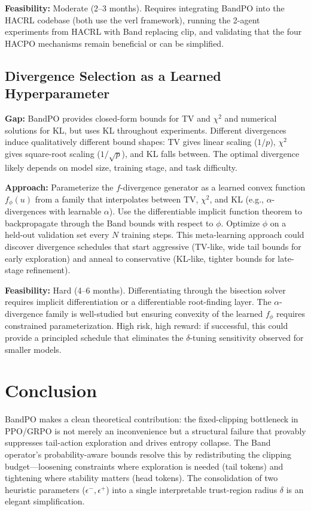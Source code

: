 \documentclass[11pt]{article}
\begin{document}
\textbf{Feasibility:} Moderate (2--3 months). Requires integrating BandPO into the HACRL codebase (both use the verl framework), running the 2-agent experiments from HACRL with Band replacing clip, and validating that the four HACPO mechanisms remain beneficial or can be simplified.

\subsection{Divergence Selection as a Learned Hyperparameter}

\textbf{Gap:} BandPO provides closed-form bounds for TV and $\chi^2$ and numerical solutions for KL, but uses KL throughout experiments. Different divergences induce qualitatively different bound shapes: TV gives linear scaling ($1/p$), $\chi^2$ gives square-root scaling ($1/\sqrt{p}$), and KL falls between. The optimal divergence likely depends on model size, training stage, and task difficulty.

\textbf{Approach:} Parameterize the $f$-divergence generator as a learned convex function $f_\phi(u)$ from a family that interpolates between TV, $\chi^2$, and KL (e.g., $\alpha$-divergences with learnable $\alpha$). Use the differentiable implicit function theorem to backpropagate through the Band bounds with respect to $\phi$. Optimize $\phi$ on a held-out validation set every $N$ training steps. This meta-learning approach could discover divergence schedules that start aggressive (TV-like, wide tail bounds for early exploration) and anneal to conservative (KL-like, tighter bounds for late-stage refinement).

\textbf{Feasibility:} Hard (4--6 months). Differentiating through the bisection solver requires implicit differentiation or a differentiable root-finding layer. The $\alpha$-divergence family is well-studied but ensuring convexity of the learned $f_\phi$ requires constrained parameterization. High risk, high reward: if successful, this could provide a principled schedule that eliminates the $\delta$-tuning sensitivity observed for smaller models.

\section{Conclusion}

BandPO makes a clean theoretical contribution: the fixed-clipping bottleneck in PPO/GRPO is not merely an inconvenience but a structural failure that provably suppresses tail-action exploration and drives entropy collapse. The Band operator's probability-aware bounds resolve this by redistributing the clipping budget---loosening constraints where exploration is needed (tail tokens) and tightening where stability matters (head tokens). The consolidation of two heuristic parameters ($\epsilon^-, \epsilon^+$) into a single interpretable trust-region radius $\delta$ is an elegant simplification.
\end{document}
